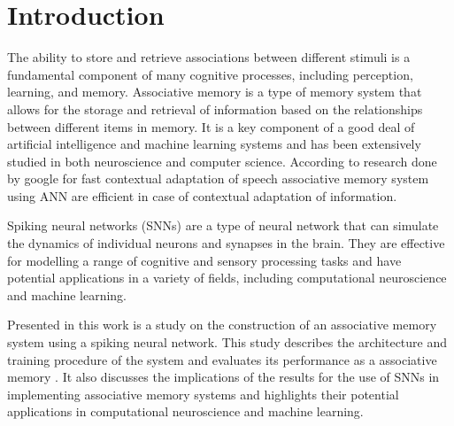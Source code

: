 \chapter{Introduction}%

The ability to store and retrieve associations between different stimuli is a
fundamental component of many cognitive processes, including perception,
learning, and memory. Associative memory is a type of memory system that allows
for the storage and retrieval of information based on the relationships between
different items in memory. It is a key component of a good deal of artificial
intelligence and machine learning systems and has been extensively studied in
both neuroscience and computer science. According to research done by google
for fast contextual adaptation of speech\cite{google} associative memory system
using ANN are efficient in case of contextual adaptation of information.

Spiking neural networks (SNNs) are a type of neural network that can simulate
the dynamics of individual neurons and synapses in the brain. They are
effective for modelling a range of cognitive and sensory processing tasks and
have potential applications in a variety of fields, including computational
neuroscience and machine learning.

Presented in this work is a study on the construction of an associative memory
system using a spiking neural network. This study describes the architecture
and training procedure of the system and evaluates its performance as a
associative memory . It also discusses the implications of the results for the
use of SNNs in implementing associative memory systems and highlights their
potential applications in computational neuroscience and machine learning.

\thispagestyle{plain}